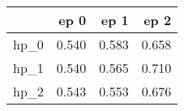 \begin{tabular}{lrrr}
\toprule
{} &   ep 0 &   ep 1 &   ep 2 \\
\midrule
hp\_0 &  0.540 &  0.583 &  0.658 \\
hp\_1 &  0.540 &  0.565 &  0.710 \\
hp\_2 &  0.543 &  0.553 &  0.676 \\
\bottomrule
\end{tabular}
